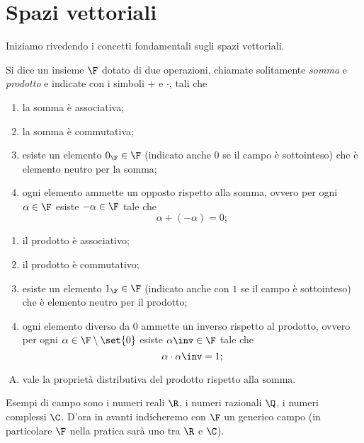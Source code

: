 \section{Spazi vettoriali}

Iniziamo rivedendo i concetti fondamentali sugli spazi vettoriali.

\begin{definition}
    [Campo] Si dice  un insieme $\F$ dotato di due operazioni, chiamate solitamente \emph{somma} e \emph{prodotto} e indicate con i simboli $+$ e $\cdot$, tali che \begin{enumerate}[(S1)]
        \item la somma è associativa;
        \item la somma è commutativa;
        \item esiste un elemento $0_{\F} \in \F$ (indicato anche $0$ se il campo è sottointeso) che è elemento neutro per la somma;
        \item ogni elemento ammette un opposto rispetto alla somma, ovvero per ogni $\alpha \in \F$ esiste $-\alpha \in \F$ tale che \[
            \alpha + (-\alpha) = 0;
        \]   
    \end{enumerate}
    \begin{enumerate}[(P1)]
        \item il prodotto è associativo;
        \item il prodotto è commutativo;
        \item esiste un elemento $1_{\F} \in \F$ (indicato anche con $1$ se il campo è sottointeso) che è elemento neutro per il prodotto;
        \item ogni elemento diverso da $0$ ammette un inverso rispetto al prodotto, ovvero per ogni $\alpha \in \F \setminus \set{0}$ esiste $\alpha\inv \in \F$ tale che \[
            \alpha \cdot \alpha\inv = 1;
        \]  
    \end{enumerate}
    \begin{enumerate}[(D)]
        \item vale la proprietà distributiva del prodotto rispetto alla somma.
    \end{enumerate}
\end{definition}

Esempi di campo sono i numeri reali $\R$, i numeri razionali $\Q$, i numeri complessi $\C$. D'ora in avanti indicheremo con $\F$ un generico campo (in particolare $\F$ nella pratica sarà uno tra $\R$ e $\C$).

